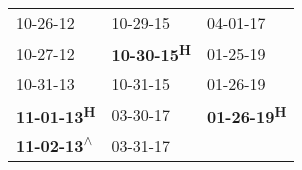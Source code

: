 \begin{supertabular}{lll}
                  10-26-12\textsuperscript{} &            10-29-15\textsuperscript{} &            04-01-17\textsuperscript{} \\
                  10-27-12\textsuperscript{} &  \textbf{10-30-15\textsuperscript{H}} &            01-25-19\textsuperscript{} \\
                  10-31-13\textsuperscript{} &            10-31-15\textsuperscript{} &            01-26-19\textsuperscript{} \\
        \textbf{11-01-13\textsuperscript{H}} &            03-30-17\textsuperscript{} &  \textbf{01-26-19\textsuperscript{H}} \\
 \textbf{11-02-13\textsuperscript{$\wedge$}} &            03-31-17\textsuperscript{} &                                       \\
\end{supertabular}

